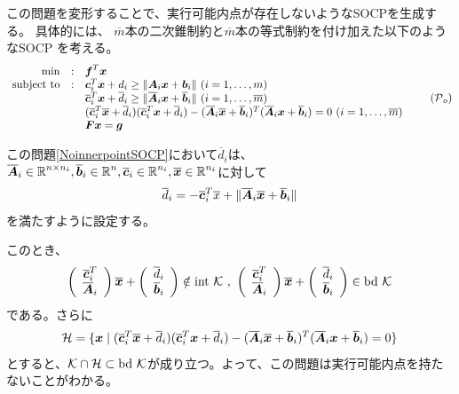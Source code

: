 \documentclass[11pt,a4paper,dvipdfmx,titlepage,uplatex]{jsarticle}
\theoremstyle{mystyle}
\newcommand{\0}{\mathbf{0}}
\def\b{\mbox{\boldmath $b$}}
\def\c{\mbox{\boldmath $c$}}
\def\f{\mbox{\boldmath $f$}}
\def\g{\mbox{\boldmath $g$}}
\def\x{\mbox{\boldmath $x$}}
\def\A{\mbox{\boldmath $A$}}
\def\F{\mbox{\boldmath $F$}}
\def\HC{\mbox{$\cal H$}}
\def\KC{\mbox{$\cal K$}}
\def\PC{\mbox{$\cal P$}}
\def\Real{\mbox{$\mathbb{R}$}}
\begin{document}
この問題を変形することで、実行可能内点が存在しないようなSOCPを生成する。
具体的には、
$\overline{m}$本の二次錐制約と$\overline{m}$本の等式制約を付け加えた以下のようなSOCP
を考える。
\begin{align}
	\begin{array}{rcl}
		\min & : & \f^T \x \\
		\text{subject to} & : & \c_i^T \x + d_i \ge \|\A_i \x + \b_i\|
		\ (i=1, \ldots, m) \\
		& & \overline{\c}_i^T \x + \overline{d}_i \ge \| \overline{\A}_i \x + \overline{\b}_i\|
		\ (i=1, \ldots, \overline{m}) \\
		& & (\overline{\c}_i^T \overline{\x} + \overline{d}_i)(\overline{\c}_i^T \x + \overline{d}_i)
    -
    (\overline{\A}_i \overline{\x} + \overline{\b}_i)^T(\overline{\A}_i \x + \overline{\b}_i) = 0 \ (i=1, \ldots, \overline{m}) \\
		& & \F \x = \g
	\end{array}
  \tag{$\PC_o$}
  \label{NoinnerpointSOCP}
\end{align}

この問題\eqref{NoinnerpointSOCP}において$\overline{d}_i$は、
$\overline{\A}_i \in \Real^{n \times n_i},
\overline{\b}_i \in \Real^{n}, \overline{\c}_i \in \Real^{n_i}, \overline{\x} \in \Real^{n_i}$に対して
\begin{align}
  \overline{d}_i = - \overline{\c}_i^T \overline{x} + \| \overline{\A}_i \overline{\x} + \overline{\b}_i \|
\end{align}
を満たすように設定する。

このとき、
\begin{align}
  \left(
  \begin{array}{c}
    \overline{\c}_i^T \\
    \overline{\A}_i
  \end{array}
  \right) \overline{\x} + \left(
  \begin{array}{c}
    \overline{d}_i \\
    \overline{\b}_i
  \end{array}
  \right)
  \notin \text{int} \ \KC \ , \
  \left(
  \begin{array}{c}
    \overline{\c}_i^T \\
    \overline{\A}_i
  \end{array}
  \right) \overline{\x} + \left(
  \begin{array}{c}
    \overline{d}_i \\
    \overline{\b}_i
  \end{array}
  \right) \in \text{bd} \ \KC
\end{align}
である。さらに
\begin{align}
  \HC = \{ \x \mid (\overline{\c}_i^T \overline{\x} + \overline{d}_i)(\overline{\c}_i^T \x + \overline{d}_i)
  -
  (\overline{\A}_i \overline{\x} + \overline{\b}_i)^T(\overline{\A}_i \x + \overline{\b}_i) = 0\}
\end{align}
とすると、$\KC \cap \HC \subset \text{bd} \ \KC$が成り立つ。よって、この問題は実行可能内点を持たないことがわかる。
\end{document}
